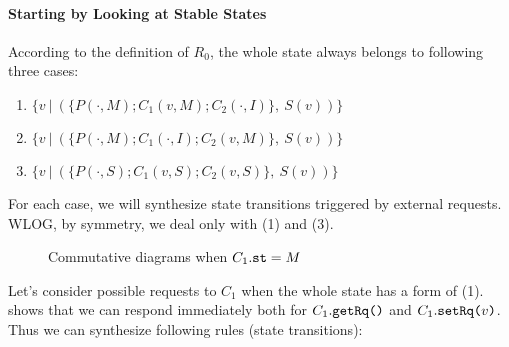 \documentclass[format=manuscript]{acmart}
\begin{document}
\paragraph{Starting by Looking at Stable States}

According to the definition of $R_0$, the whole state always belongs to
following three cases:

\begin{enumerate}
\item $\{ v\ |\ (\{ P(\cdot, M); C_1(v, M); C_2(\cdot, I) \},\ S(v)) \}$
\item $\{ v\ |\ (\{ P(\cdot, M); C_1(\cdot, I); C_2(v, M) \},\ S(v)) \}$
\item $\{ v\ |\ (\{ P(\cdot, S); C_1(v, S); C_2(v, S) \},\ S(v)) \}$
\end{enumerate}

For each case, we will synthesize state transitions triggered by external
requests. WLOG, by symmetry, we deal only with (1) and (3).

\begin{figure}
  \caption{Commutative diagrams when $C_1.\texttt{st} = M$}
  \label{fig:comm-diagram-status-m}
\end{figure}

Let's consider possible requests to $C_1$ when the whole state has a form of
(1).  shows that we can respond immediately
both for $C_1.\texttt{getRq()}$ and $C_1.\texttt{setRq(}v\texttt{)}$. Thus we can synthesize
following rules (state transitions):

\begin{center}
\end{center}
\end{document}
